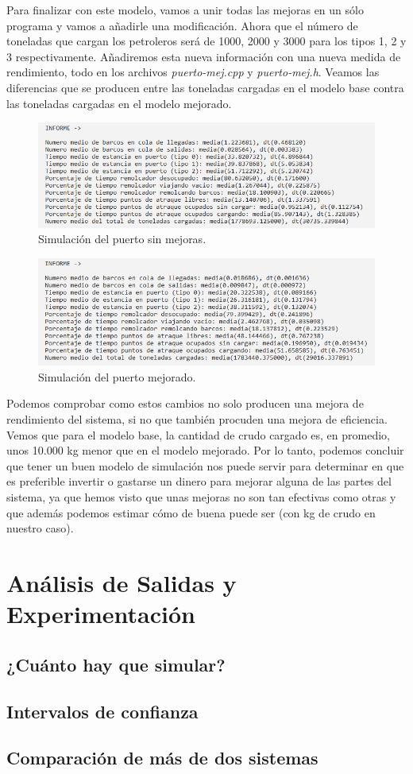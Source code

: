 \documentclass[11pt,a4paper]{report}
\begin{document}
Para finalizar con este modelo, vamos a unir todas las mejoras en un sólo programa y vamos a añadirle una modificación. Ahora que el número de toneladas que cargan los petroleros será
de 1000, 2000 y 3000 para los tipos 1, 2 y 3 respectivamente. Añadiremos esta nueva información con una nueva medida de rendimiento, todo en los archivos \textit{puerto-mej.cpp} y
\textit{puerto-mej.h}. Veamos las diferencias que se producen entre las toneladas cargadas en el modelo base contra las toneladas cargadas en el modelo mejorado.
\begin{figure}[H]
\centering
\includegraphics[scale=0.7]{img/puerto-mej1.png}
\caption{Simulación del puerto sin mejoras.}
\end{figure}
\begin{figure}[H]
\centering
\includegraphics[scale=0.7]{img/puerto-mej2.png}
\caption{Simulación del puerto mejorado.}
\end{figure}

Podemos comprobar como estos cambios no solo producen una mejora de rendimiento del sistema, si no que también procuden una mejora de eficiencia. Vemos que para el modelo base, la
cantidad de crudo cargado es, en promedio, unos 10.000 kg menor que en el modelo mejorado. Por lo tanto, podemos concluir que tener un buen modelo de simulación nos puede servir
para determinar en que es preferible invertir o gastarse un dinero para mejorar alguna de las partes del sistema, ya que hemos visto que unas mejoras no son tan efectivas como otras
y que además podemos estimar cómo de buena puede ser (con kg de crudo en nuestro caso).



\chapter{Análisis de Salidas y Experimentación}



\section{¿Cuánto hay que simular?}

\section{Intervalos de confianza}

\section{Comparación de más de dos sistemas}
\end{document}
